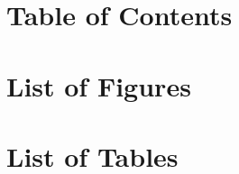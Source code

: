 \newpage
\section*{Table of Contents}
\startcontents[sections]
\thispagestyle{empty}
\newpage
\renewcommand{\listfigurename}{}
\section*{List of Figures}
\vspace{-6ex}
\listoffigures
\renewcommand{\listtablename}{}
\section*{List of Tables}
\vspace{-6ex}
\listoftables
\thispagestyle{empty}